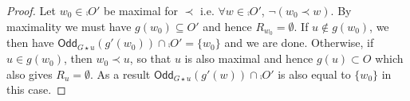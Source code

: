 \documentclass[a4paper,onecolumn,superscriptaddress,11pt,accepted=2020-04-27]{quantumarticle}
\newcommand{\symd}{\mathbin{\Delta}\xspace}
\newcommand{\Symdi}[1]{\underset{\scriptstyle #1}{\scalebox{1.5}{$\symd$}}\,}
\newcommand{\odd}[2]{\textsf{Odd}_{#1}\left(#2\right)}
\theoremstyle{definition}
\newcommand{\NOTEj}[1]{\marginpar{\footnotesize {\color{purple} \noindent\textbf{j:} #1}}}
\begin{document}
\begin{proof}







Let $w_0\in \comp{O'}$ be maximal for $\prec$ i.e. $\forall w\in \comp{O'}$, $\neg (w_0\prec w)$. By maximality we must have $g(w_0)\subseteq O'$ and hence $R_{w_0} = \emptyset$. 
If $u\notin g(w_0)$, we then have $\odd{G\star u}{g'(w_0)}\cap \comp{O'} = \{w_0\}$ and we are done. Otherwise, if $u\in g(w_0)$, then $w_0\prec u$, so that $u$ is also maximal and hence $g(u)\subset O$ which also gives $R_u=\emptyset$. As a result $\odd{G\star u}{g'(w)}\cap \comp{O'}$ is also equal to $\{w_0\}$ in this case.

%
% 
%
%
%
%


\end{proof}
\end{document}
